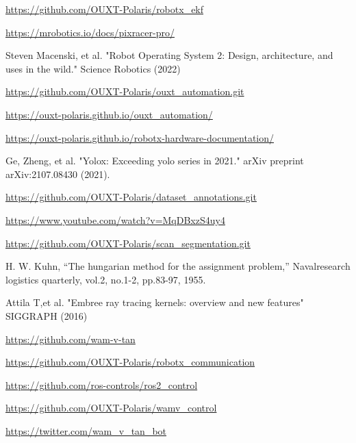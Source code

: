 \documentclass[lettersize,journal]{IEEEtran}
\begin{document}
\begin{thebibliography}{1}

    \url{https://github.com/OUXT-Polaris/robotx_ekf}

    \url{https://mrobotics.io/docs/pixracer-pro/}

    Steven Macenski, et al. "Robot Operating System 2: Design, architecture, and uses in the wild." Science Robotics (2022)

    \url{https://github.com/OUXT-Polaris/ouxt_automation.git}

    \url{https://ouxt-polaris.github.io/ouxt_automation/}

    \url{https://ouxt-polaris.github.io/robotx-hardware-documentation/}

    Ge, Zheng, et al. "Yolox: Exceeding yolo series in 2021." arXiv preprint arXiv:2107.08430 (2021).

    \url{https://github.com/OUXT-Polaris/dataset_annotations.git}

    \url{https://www.youtube.com/watch?v=MqDBxzS4uy4}

    \url{https://github.com/OUXT-Polaris/scan_segmentation.git}

    H. W. Kuhn, “The hungarian method for the assignment problem,” Navalresearch logistics quarterly, vol.2, no.1-2, pp.83-97, 1955.

    Attila T,et al. "Embree ray tracing kernels: overview and new features" SIGGRAPH (2016)

    \url{https://github.com/wam-v-tan}

    \url{https://github.com/OUXT-Polaris/robotx_communication}

    \url{https://github.com/ros-controls/ros2_control}

    \url{https://github.com/OUXT-Polaris/wamv_control}

    \url{https://twitter.com/wam_v_tan_bot}

\end{thebibliography}

\vfill
\end{document}
